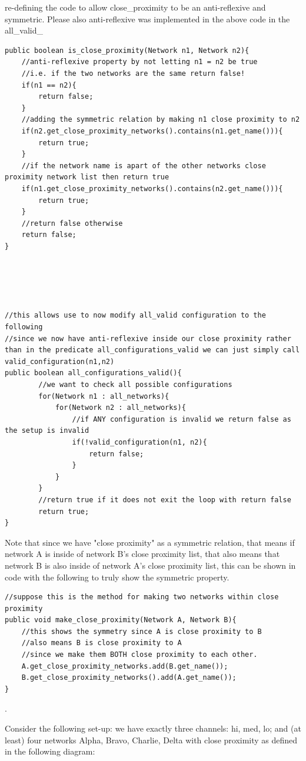 \documentclass{article}
\begin{document}
\begin{enumerate}[(a)]
\begin{enumerate}[(i)]
            re-defining the code to allow close\_proximity to be an anti-reflexive and symmetric. Please also anti-reflexive was implemented in the above code in the all\_valid\_
            \begin{lstlisting}
public boolean is_close_proximity(Network n1, Network n2){
    //anti-reflexive property by not letting n1 = n2 be true
    //i.e. if the two networks are the same return false!
    if(n1 == n2){
        return false;
    }
    //adding the symmetric relation by making n1 close proximity to n2
    if(n2.get_close_proximity_networks().contains(n1.get_name())){
        return true;
    }
    //if the network name is apart of the other networks close proximity network list then return true
    if(n1.get_close_proximity_networks().contains(n2.get_name())){
        return true;
    }
    //return false otherwise
    return false;
}
            
            
            
            
            
//this allows use to now modify all_valid configuration to the following
//since we now have anti-reflexive inside our close proximity rather than in the predicate all_configurations_valid we can just simply call valid_configuration(n1,n2)
public boolean all_configurations_valid(){
        //we want to check all possible configurations
        for(Network n1 : all_networks){
            for(Network n2 : all_networks){
                //if ANY configuration is invalid we return false as the setup is invalid
                if(!valid_configuration(n1, n2){
                    return false;
                }
            }
        }
        //return true if it does not exit the loop with return false
        return true;
}
            \end{lstlisting}
            
        \end{enumerate}
        Note that since we have "close proximity" as a symmetric relation, that means if network A is inside of network B's close proximity list, that also means that network B is also inside of network A's close proximity list, this can be shown in code with the following to truly show the symmetric property.
        
        \begin{lstlisting}
//suppose this is the method for making two networks within close proximity
public void make_close_proximity(Network A, Network B){
    //this shows the symmetry since A is close proximity to B
    //also means B is close proximity to A
    //since we make them BOTH close proximity to each other.
    A.get_close_proximity_networks.add(B.get_name());
    B.get_close_proximity_networks().add(A.get_name());
}
        \end{lstlisting}.
        \newpage
        \begin{flushleft}
            Consider the following set-up: we have exactly three channels: hi, med, lo; and (at least) four networks Alpha, Bravo, Charlie, Delta with close proximity as defined in the following diagram:
        \end{flushleft}


\end{enumerate}
\end{document}
